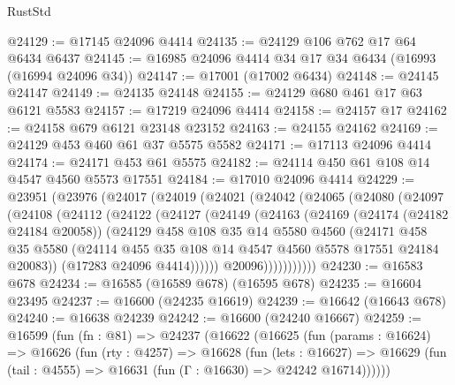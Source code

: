 \begin{lexlean}{RustStd}
\begin{coremodule}
{\begin{coremodule}
{{{{{{{{{{{{{{{{{{{{{{{{{{{{{{{{{{{{{{{{{{{{{{{{{{{{{{{@24129 := @17145 @24096 @4414
@24135 := @24129 @106 @762 @17 @64 @6434 @6437
@24145 := @16985 @24096 @4414 @34 @17 @34 @6434 (@16993 (@16994 @24096 @34))
@24147 := @17001 (@17002 @6434)
@24148 := @24145 @24147
@24149 := @24135 @24148
@24155 := @24129 @680 @461 @17 @63 @6121 @5583
@24157 := @17219 @24096 @4414
@24158 := @24157 @17
@24162 := @24158 @679 @6121 @23148 @23152
@24163 := @24155 @24162
@24169 := @24129 @453 @460 @61 @37 @5575 @5582
@24171 := @17113 @24096 @4414
@24174 := @24171 @453 @61 @5575
@24182 := @24114 @450 @61 @108 @14 @4547 @4560 @5573 @17551
@24184 := @17010 @24096 @4414
@24229 := @23951
    (@23976
      (@24017
        (@24019
          (@24021
            (@24042
              (@24065
                (@24080
                  (@24097
                    (@24108
                      (@24112
                        (@24122
                          (@24127
                            (@24149
                              (@24163
                                (@24169
                                  (@24174 (@24182 @24184 @20058))
                                  (@24129
                                    @458
                                    @108
                                    @35
                                    @14
                                    @5580
                                    @4560
                                    (@24171
                                      @458
                                      @35
                                      @5580
                                      (@24114
                                        @455
                                        @35
                                        @108
                                        @14
                                        @4547
                                        @4560
                                        @5578
                                        @17551
                                        @24184
                                        @20083))
                                    (@17283 @24096 @4414))))))
                          @20096)))))))))))
@24230 := @16583 @678
@24234 := @16585 (@16589 @678) (@16595 @678)
@24235 := @16604 @23495
@24237 := @16600 (@24235 @16619)
@24239 := @16642 (@16643 @678)
@24240 := @16638 @24239
@24242 := @16600 (@24240 @16667)
@24259 := @16599
    (fun (fn : @81) =>
    @24237
      (@16622
        (@16625
          (fun (params : @16624) =>
          @16626
            (fun (rty : @4257) =>
            @16628
              (fun (lets : @16627) =>
              @16629 (fun (tail : @4555) => @16631 (fun (Γ : @16630) => @24242 @16714))))))
}}}}}}}}}}}}}}}}}}}}}}}}}}}}}}}}}}}}}}}}}}}}}}}}}}}}}}}
\end{coremodule}}
\end{coremodule}
\end{lexlean}
